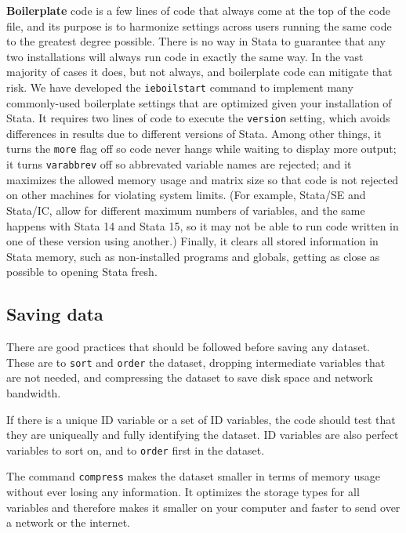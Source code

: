 \textbf{Boilerplate} code is a few lines of code that always come at the top of the code file,
and its purpose is to harmonize settings across users
running the same code to the greatest degree possible.
There is no way in Stata to guarantee that any two installations
will always run code in exactly the same way.
In the vast majority of cases it does, but not always,
and boilerplate code can mitigate that risk.
We have developed the \texttt{ieboilstart} command
to implement many commonly-used boilerplate settings
that are optimized given your installation of Stata.
It requires two lines of code to execute the \texttt{version}
setting, which avoids differences in results due to different versions of Stata.
Among other things, it turns the \texttt{more} flag off
so code never hangs while waiting to display more output;
it turns \texttt{varabbrev} off so abbrevated variable names are rejected;
and it maximizes the allowed memory usage and matrix size
so that code is not rejected on other machines for violating system limits.
(For example, Stata/SE and Stata/IC, allow for different maximum numbers of variables,
and the same happens with Stata 14 and Stata 15,
so it may not be able to run code written in one of these version using another.)
Finally, it clears all stored information in Stata memory,
such as non-installed programs and globals,
getting as close as possible to opening Stata fresh.


\subsection{Saving data}

There are good practices that should be followed before saving any dataset.
These are to \texttt{sort} and \texttt{order} the dataset,
dropping intermediate variables that are not needed,
and compressing the dataset to save disk space and network bandwidth.

If there is a unique ID variable or a set of ID variables,
the code should test that they are uniqueally and
fully identifying the dataset.
ID variables are also perfect variables to sort on,
and to \texttt{order} first in the dataset.

The command \texttt{compress} makes the dataset smaller in terms of memory usage
without ever losing any information.
It optimizes the storage types for all variables
and therefore makes it smaller on your computer
and faster to send over a network or the internet.

